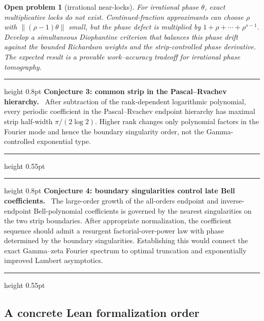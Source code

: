 \documentclass[11pt,oneside]{article}
\numberwithin{equation}{section}
\newtheorem{problem}[theorem]{Open problem}
\theoremstyle{definition}
\theoremstyle{remark}
\newenvironment{conjecturebox}[1]{%
  \par\medskip\noindent\begin{center}\begin{minipage}{0.94\textwidth}%
  \color{Gold}\hrule height 0.8pt\vspace{0.6em}%
  \color{black}\textbf{\color{Gold}#1.}\ }{%
  \par\vspace{0.6em}\color{Gold}\hrule height 0.55pt
  \end{minipage}\end{center}\medskip}
\begin{document}
\begin{problem}[irrational near-locks]
For irrational phase $\theta$, exact multiplicative locks do not exist.  Continued-fraction
approximants can choose $\rho$ with $\|(\rho-1)\theta\|$ small, but the phase defect is
multiplied by $1+\rho+\cdots+\rho^{s-1}$.  Develop a simultaneous Diophantine criterion that
balances this phase drift against the bounded Richardson weights and the strip-controlled
phase derivative.  The expected result is a provable work--accuracy tradeoff for irrational
phase tomography.
\end{problem}

\begin{conjecturebox}{Conjecture 3: common strip in the Pascal--Rvachev hierarchy}
After subtraction of the rank-dependent logarithmic polynomial, every periodic coefficient
in the Pascal--Rvachev endpoint hierarchy has maximal strip half-width
$\pi/(2\log2)$.  Higher rank changes only polynomial factors in the Fourier mode and hence
the boundary singularity order, not the Gamma-controlled exponential type.
\end{conjecturebox}

\begin{conjecturebox}{Conjecture 4: boundary singularities control late Bell coefficients}
The large-order growth of the all-orders endpoint and inverse-endpoint Bell-polynomial
coefficients is governed by the nearest singularities on the two strip boundaries.  After
appropriate normalization, the coefficient sequence should admit a resurgent
factorial-over-power law with phase determined by the boundary singularities.  Establishing
this would connect the exact Gamma--zeta Fourier spectrum to optimal truncation and
exponentially improved Lambert asymptotics.
\end{conjecturebox}

\subsection{A concrete Lean formalization order}
\end{document}
